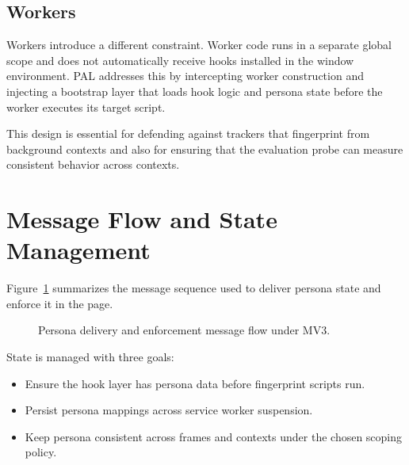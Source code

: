 \documentclass[11pt]{report}
\begin{document}
\subsection{Workers}

Workers introduce a different constraint. Worker code runs in a separate global scope and does not automatically receive hooks installed in the window environment. PAL addresses this by intercepting worker construction and injecting a bootstrap layer that loads hook logic and persona state before the worker executes its target script.

This design is essential for defending against trackers that fingerprint from background contexts and also for ensuring that the evaluation probe can measure consistent behavior across contexts.

\section{Message Flow and State Management}

Figure~\ref{fig:message_flow} summarizes the message sequence used to deliver persona state and enforce it in the page.

\begin{figure}[H]
\centering
{}
\caption{Persona delivery and enforcement message flow under MV3.}
\label{fig:message_flow}
\end{figure}

State is managed with three goals:

\begin{itemize}
    \item Ensure the hook layer has persona data before fingerprint scripts run.
    \item Persist persona mappings across service worker suspension.
    \item Keep persona consistent across frames and contexts under the chosen scoping policy.
\end{itemize}
\end{document}
